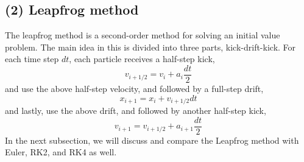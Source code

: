 \documentclass[12pt]{article}
\begin{document}
  \subsection{(2) Leapfrog method}
  The leapfrog method is a second-order method for solving an initial value problem. The main idea in this is divided into three parts, kick-drift-kick. For each time step $dt$, each particle receives a half-step kick,
  \[v_{i+1/2} = v_i + a_i\frac{dt}{2}\]
  and use the above half-step velocity, and followed by a full-step drift,
  \[x_{i+1} = x_i + v_{i+1/2}dt\]
  and lastly, use the above drift, and followed by another half-step kick,
  \[v_{i+1} = v_{i+1/2} + a_{i+1}\frac{dt}{2}\]
  \newline
  In the next subsection, we will discuss and compare the Leapfrog method with Euler, RK2, and RK4 as well.
\end{document}

